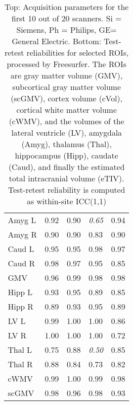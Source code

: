 \begin{table}
\begin{tabular}{lllll}
\midrule
Amyg L                &               0.92 &               0.90 &                 \textit{0.65} &                 0.94 \\
Amyg R                &               0.90 &               0.90 &                 0.83 &                 0.90 \\
Caud L                &               0.95 &               0.95 &                 0.98 &                 0.97 \\
Caud R                &               0.98 &               0.97 &                 0.95 &                 0.85 \\
GMV                   &               0.96 &               0.99 &                 0.98 &                 0.98 \\
Hipp L                &               0.93 &               0.95 &                 0.89 &                 0.85 \\
Hipp R                &               0.89 &               0.93 &                 0.95 &                 0.89 \\
LV L                  &               0.99 &               1.00 &                 1.00 &                 0.86 \\
LV R                  &               1.00 &               1.00 &                 1.00 &                 0.72 \\
Thal L                &               0.75 &               0.88 &                 \textit{0.50} &                 0.85 \\
Thal R                &               0.88 &               0.84 &                 0.73 &                 0.82 \\
cWMV                  &               0.99 &               1.00 &                 0.99 &                 0.98 \\
scGMV                 &               0.98 &               0.96 &                 0.98 &                 0.93 \\
\bottomrule
\end{tabular}
\caption{Top: Acquisition parameters for the first 10 out of 20 scanners. Si = Siemens, Ph = Philips, GE= General Electric. Bottom: Test-retest reliabilities for selected ROIs, processed by Freesurfer. The ROIs are gray matter volume (GMV), subcortical gray matter volume (scGMV), cortex volume (cVol), cortical white matter volume (cWMV), and the volumes of the lateral ventricle (LV), amygdala (Amyg), thalamus (Thal), hippocampus (Hipp), caudate (Caud), and finally the estimated total intracranial volume (eTIV). Test-retest reliability is computed as within-site ICC(1,1)} 
\label{tab:acquisition1}

\end{table}